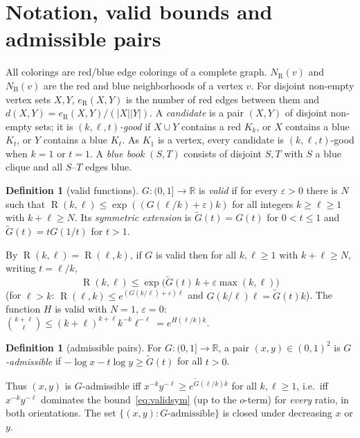 \documentclass[11pt]{article}
\theoremstyle{definition}
\newtheorem{definition}[theorem]{Definition}
\newcommand{\R}{\mathbb{R}}
\newcommand{\Gt}{\widetilde G}
\newcommand{\eR}{e_{\mathrm R}}
\newcommand{\NR}{N_{\mathrm R}}
\newcommand{\NB}{N_{\mathrm B}}
\newcommand{\eps}{\varepsilon}
\DeclareMathOperator{\Ram}{R}
\begin{document}
\section{Notation, valid bounds and admissible pairs}\label{sec:prelim}

All colorings are red/blue edge colorings of a complete graph.  $\NR(v)$ and $\NB(v)$ are the red and blue neighborhoods of a vertex $v$.  For disjoint non-empty vertex sets $X,Y$, $\eR(X,Y)$ is the number of red edges between them and $d(X,Y)=\eR(X,Y)/(|X||Y|)$.  A \emph{candidate} is a pair $(X,Y)$ of disjoint non-empty sets; it is \emph{$(k,\ell,t)$-good} if $X\cup Y$ contains a red $K_k$, or $X$ contains a blue $K_t$, or $Y$ contains a blue $K_\ell$.  As $K_1$ is a vertex, every candidate is $(k,\ell,t)$-good when $k=1$ or $t=1$.  A \emph{blue book} $(S,T)$ consists of disjoint $S,T$ with $S$ a blue clique and all $S$--$T$ edges blue.

\begin{definition}[valid functions]\label{def:valid}
$G\colon(0,1]\to\R$ is \emph{valid} if for every $\eps>0$ there is $N$ such that $\Ram(k,\ell)\le\exp((G(\ell/k)+\eps)k)$ for all integers $k\ge\ell\ge1$ with $k+\ell\ge N$.  Its \emph{symmetric extension} is $\Gt(t)=G(t)$ for $0<t\le1$ and $\Gt(t)=tG(1/t)$ for $t>1$.
\end{definition}

By $\Ram(k,\ell)=\Ram(\ell,k)$, if $G$ is valid then for all $k,\ell\ge1$ with $k+\ell\ge N$, writing $t=\ell/k$,
\begin{equation}\label{eq:validsym}
\Ram(k,\ell)\le\exp\bigl(\Gt(t)\,k+\eps\max(k,\ell)\bigr)
\end{equation}
(for $\ell>k$: $\Ram(\ell,k)\le e^{(G(k/\ell)+\eps)\ell}$ and $G(k/\ell)\ell=\Gt(t)k$).  The function $H$ is valid with $N=1$, $\eps=0$: $\binom{k+\ell}{\ell}\le(k+\ell)^{k+\ell}k^{-k}\ell^{-\ell}=e^{H(\ell/k)k}$.

\begin{definition}[admissible pairs]\label{def:adm}
For $G\colon(0,1]\to\R$, a pair $(x,y)\in(0,1)^2$ is \emph{$G$-admissible} if $-\log x-t\log y\ge\Gt(t)$ for all $t>0$.
\end{definition}

Thus $(x,y)$ is $G$-admissible iff $x^{-k}y^{-\ell}\ge e^{\Gt(\ell/k)k}$ for all $k,\ell\ge1$, i.e.\ iff $x^{-k}y^{-\ell}$ dominates the bound~\eqref{eq:validsym} (up to the $o$-term) for \emph{every} ratio, in both orientations.  The set $\{(x,y):G\text{-admissible}\}$ is closed under decreasing $x$ or $y$.
\end{document}
